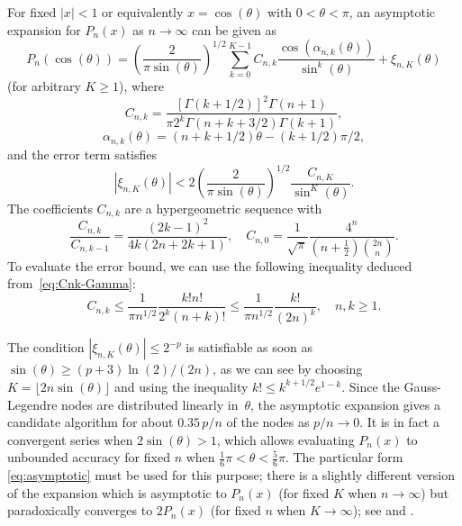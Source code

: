 \documentclass[nohypdvips,review]{siamart0216}
\begin{document}
For fixed $|x| < 1$ or equivalently $x = \cos(\theta)$ with $0 < \theta < \pi$,
an asymptotic expansion for $P_n(x)$ as $n \to \infty$
can be given as \cite[Eq.~3.4]{Bogaert2012}
\begin{equation}
\label{eq:asymptotic}
P_n(\cos(\theta)) = \left(\frac{2}{\pi \sin(\theta)}\right)^{1/2}
\sum_{k=0}^{K-1} C_{n,k} \frac{\cos(\alpha_{n,k}(\theta))}{\sin^k(\theta)}
+ \xi_{n,K}(\theta)
\end{equation}
(for arbitrary $K \geq 1$), where
\begin{equation}
\label{eq:Cnk-Gamma}
C_{n,k} = \frac{[\Gamma(k+1/2)]^2 \Gamma(n+1)}{\pi 2^k \Gamma(n+k+3/2) \Gamma(k+1)},
\end{equation}
\begin{equation*}
\alpha_{n,k}(\theta) = (n+k+1/2) \theta - (k+1/2) \pi / 2,
\end{equation*}
and the error term satisfies
\begin{equation}
\label{eq:truncerr0}
|\xi_{n,K}(\theta)| < 2 \left(\frac{2}{\pi \sin(\theta)}\right)^{1/2} \frac{C_{n,K}}{\sin^K(\theta)}.
\end{equation}
The coefficients $C_{n,k}$ are a hypergeometric sequence with
\begin{equation}
\label{eq:asymprec}
\frac{C_{n,k}}{C_{n,k-1}} = \frac{(2k-1)^2}{4 k (2n+2k+1)}, \quad C_{n,0} = \frac{1}{\sqrt{\pi}} \frac{4^n}{(n+\tfrac{1}{2}) {2n \choose n}}.
\end{equation}
To evaluate the error bound, we can use the following inequality deduced
from~\cref{eq:Cnk-Gamma}:
\begin{equation}
\label{eq:truncerr0b}
C_{n,k} \le \frac{1}{\pi n^{1/2}} \frac{k! n!}{2^k (n+k)!} \le \frac{1}{\pi n^{1/2}} \frac{k!}{(2n)^k},
\quad n, k \ge 1.
\end{equation}

The condition
$|\xi_{n,K}(\theta)| \leq 2^{-p}$
is satisfiable as soon as
$\sin(\theta) \geq (p+3)\ln(2)/(2n)$,
as we can see by choosing
$K = \lfloor 2 n \sin(\theta) \rfloor$
and using the inequality
$k! \leq k^{k+1/2} e^{1-k}$.
Since the Gauss-Legendre nodes are distributed linearly in~$\theta$,
the asymptotic expansion gives a candidate algorithm for about
$0.35\,p/n$ of the nodes as $p/n \to 0$.
It is in fact a convergent series
when $2 \sin(\theta) > 1$, which allows evaluating $P_n(x)$ to unbounded
accuracy for fixed $n$ when $\tfrac{1}{6}\pi < \theta < \tfrac{5}{6} \pi$.
The particular form \cref{eq:asymptotic}
must be used for this purpose; there is a slightly different version of the expansion
which is asymptotic to $P_n(x)$ (for fixed $K$ when $n \to \infty$)
but paradoxically
converges to $2 P_n(x)$ (for fixed $n$ when $K \to \infty$); see \cite[Section~10.3]{Olver1997} and \cite[Section~18.15(iii)]{Olver2010}.
\end{document}
